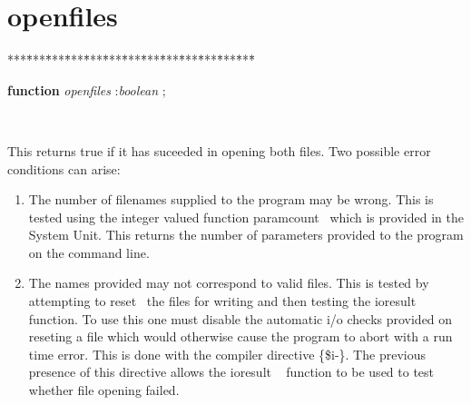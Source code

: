 \documentclass[10pt, a4paper]{article}
\begin{document}
\section{openfiles}\label{sec:./uniquewordsopenfiles}

\begin{tabbing}
***\=***\=***\=***\=***\=***\=***\=***\=***\=***\=***\=***\=***\=\kill
\parbox{14cm}{\textsf{\textbf{function}  \textit{openfiles} :\textit{boolean} ;}}\\
\end{tabbing}
This returns true if it has suceeded in opening both files.
Two possible error conditions can arise:
\begin{enumerate}
\item The number of filenames supplied to the program may be wrong.
This is tested using the integer valued function \textsf{{paramcount}\ }
which is provided in the System Unit. This returns the number of parameters
provided to the program on the command line.
\item The names provided may not  correspond to  valid files.
This is tested by attempting to \textsf{{reset}\ } the files for writing
and then testing the ioresult function. To use this one must disable the
automatic i/o checks provided on reseting a file which would otherwise
cause the program to abort with a run time error. This is done with
the compiler directive \{\$i-\}.
The previous presence of this directive allows the \textsf{ ioresult \ } function
to be used to test whether file opening failed.
\end{enumerate}
\end{document}
